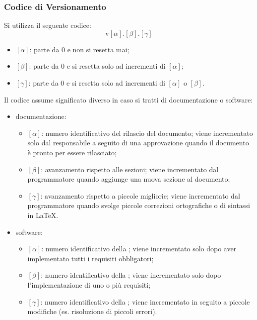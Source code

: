 \documentclass[]{article}
\begin{document}
			\subsubsection{Codice di Versionamento}
			Si utilizza il seguente codice:
			\[
				\text{v}[\alpha].[\beta].[\gamma]
			\]
			\begin{itemize}
				\item \([\alpha]\): parte da 0 e non si resetta mai;
				\item \([\beta]\): parte da 0 e si resetta solo ad incrementi di \([\alpha]\);
				\item \([\gamma]\): parte da 0 e si resetta solo ad incrementi di \([\alpha]\) o \([\beta]\).
			\end{itemize}
			Il codice assume significato diverso in caso si tratti di documentazione o software:
			\begin{itemize}
				\item documentazione:
				\begin{itemize}
					\item \([\alpha]\): numero identificativo del rilascio del documento; viene incrementato solo dal responsabile a seguito di una approvazione quando il documento è pronto per essere rilasciato;
					\item \([\beta]\): avanzamento rispetto alle sezioni; viene incrementato dal programmatore quando aggiunge una nuova sezione al documento;
					\item \([\gamma]\): avanzamento rispetto a piccole migliorie; viene incrementato dal programmatore quando svolge piccole correzioni ortografiche o di sintassi in \LaTeX.
				\end{itemize}

				\item software:
				\begin{itemize}
					\item \([\alpha]\): numero identificativo della ; viene incrementato solo dopo aver implementato tutti i requisiti obbligatori;
					\item \([\beta]\): numero identificativo della ; viene incrementato solo dopo l'implementazione di uno o più requisiti;
					\item \([\gamma]\): numero identificativo della ; viene incrementato in seguito a piccole modifiche (es. risoluzione di piccoli errori).
					\end{itemize}
			\end{itemize}
\end{document}
